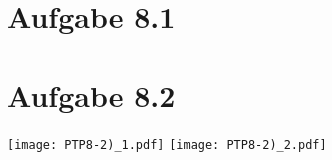 \documentclass{theozettel}
\begin{document}

\section*{Aufgabe 8.1} 




\section*{Aufgabe 8.2}	
\begin{center}
\texttt{[image: PTP8-2)\_1.pdf]}
\texttt{[image: PTP8-2)\_2.pdf]}
\end{center}
\newpage
\end{document}
